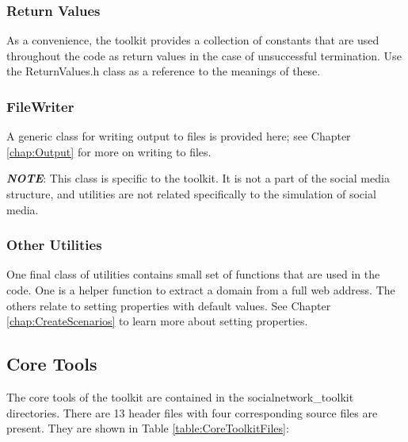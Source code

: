 \subsubsection{Return Values}
As a convenience, the toolkit provides a collection of constants that are used throughout the code as return values in the case of unsuccessful termination. Use the ReturnValues.h class as a reference to the meanings of these.

\subsubsection{FileWriter}
A generic class for writing output to files is provided here; see Chapter \ref{chap:Output} for more on writing to files.
\par \textbf{\textit{NOTE}}: This class is specific to the \rhpc toolkit. It is not a part of the social media structure, and utilities are not related specifically to the simulation of social media.

\subsubsection{Other Utilities}
One final class of utilities contains small set of functions that are used in the code. One is a helper function to extract a domain from a full web address. The others relate to setting properties with default values. See Chapter \ref{chap:CreateScenarios} to learn more about setting properties.

\subsection{Core Tools}

\par The core tools of the \rhpc toolkit are contained in the socialnetwork\_toolkit directories. There are 13 header files with four corresponding source files are present.   
They are shown in Table \ref{table:CoreToolkitFiles}:

